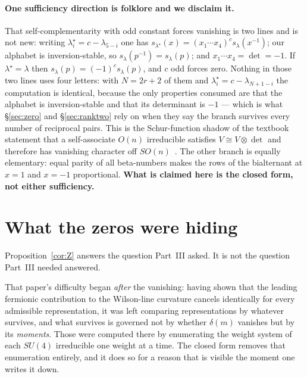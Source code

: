 \documentclass[11pt,a4paper]{article}
\newcommand{\su}[1]{SU(#1)}
\begin{document}
\paragraph{One sufficiency direction is folklore and we disclaim it.} That
self-complementarity with odd constant forces vanishing is two lines and is not new: writing
$\lambda^\star_i=c-\lambda_{5-i}$ one has $s_{\lambda^\star}(x)=(x_1\cdots x_4)^c
s_\lambda(x^{-1})$; our alphabet is inversion-stable, so $s_\lambda(p^{-1})=s_\lambda(p)$; and
$x_1\cdots x_4=\det=-1$. If $\lambda^\star=\lambda$ then $s_\lambda(p)=(-1)^cs_\lambda(p)$, and
$c$ odd forces zero. Nothing in those two lines uses four letters: with $N=2r+2$ of them and
$\lambda^\star_i=c-\lambda_{N+1-i}$ the computation is identical, because the only properties
consumed are that the alphabet is inversion-stable and that its determinant is $-1$ --- which is
what \S\ref{sec:zero} and \S\ref{sec:ranktwo} rely on when they say the branch survives every
number of reciprocal pairs. This is the Schur-function shadow of the textbook statement that a
self-associate $O(n)$ irreducible satisfies $V\cong V\otimes\det$ and therefore has vanishing
character off $SO(n)$~\cite[Ch.~XI, \S11.6, \S11.8]{LittlewoodBook}. The other branch is
equally elementary: equal parity of all beta-numbers makes the rows of the bialternant at $x=1$
and $x=-1$ proportional. \textbf{What is claimed here is the closed form, not either
sufficiency.}

\section{What the zeros were hiding}\label{sec:moments}

Proposition~\ref{cor:Z} answers the question Part~III asked. It is not the question Part~III
needed answered.

That paper's difficulty began \emph{after} the vanishing: having shown that the leading
fermionic contribution to the Wilson-line curvature cancels identically for every admissible
representation, it was left comparing representations by whatever survives, and what survives is
governed not by whether $\delta(m)$ vanishes but by its \emph{moments}. Those were computed
there by enumerating the weight system of each $\su4$ irreducible one weight at a time. The
closed form removes that enumeration entirely, and it does so for a reason that is visible the
moment one writes it down.
\end{document}
